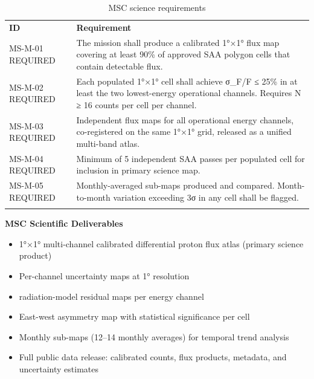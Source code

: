\begin{longtable}{@{}
  >{\raggedright\arraybackslash}p{}
  >{\raggedright\arraybackslash}p{}@{}}
\caption{MSC science requirements}\label{tab:01-mission-context-6}\\
\toprule\noalign{}
\textbf{ID} & \textbf{Requirement} \\
MS-M-01 REQUIRED & The mission shall produce a calibrated 1°×1° flux map covering at least
90\% of approved SAA polygon cells that contain detectable flux. \\
MS-M-02 REQUIRED & Each populated 1°×1° cell shall achieve σ\_F/F ≤ 25\% in at least the
two lowest-energy operational channels. Requires N ≥ 16 counts per cell
per channel. \\
MS-M-03 REQUIRED & Independent flux maps for all operational energy channels, co-registered
on the same 1°×1° grid, released as a unified multi-band atlas. \\
MS-M-04 REQUIRED & Minimum of 5 independent SAA passes per populated cell for inclusion in
primary science map. \\
MS-M-05 REQUIRED & Monthly-averaged sub-maps produced and compared. Month-to-month
variation exceeding 3σ in any cell shall be flagged. \\
\midrule\noalign{}
\endhead
\bottomrule\noalign{}
\endlastfoot
\end{longtable}

\textbf{MSC Scientific Deliverables}

\begin{itemize}
\item
  1°×1° multi-channel calibrated differential proton flux atlas (primary
  science product)
\item
  Per-channel uncertainty maps at 1° resolution
\item
  radiation-model residual maps per energy channel
\item
  East-west asymmetry map with statistical significance per cell
\item
  Monthly sub-maps (12--14 monthly averages) for temporal trend analysis
\item
  Full public data release: calibrated counts, flux products, metadata,
  and uncertainty estimates
\end{itemize}

